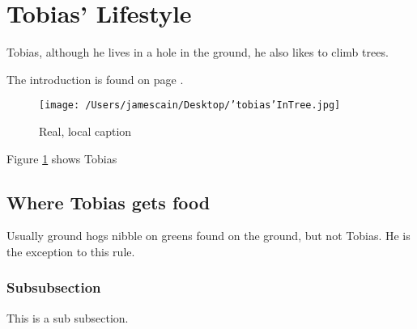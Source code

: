 \documentclass{article}
\begin{document}
\lipsum[1]


\newpage
\section{Tobias' Lifestyle}
Tobias, although he lives in a hole in the ground, he also likes to climb trees.

The introduction is found on page \pageref{sec:intro}.

\begin{figure}[H]
    \centering
    \texttt{[image: /Users/jamescain/Desktop/'tobias'InTree.jpg]}
    \caption[Optional caption]{Real, local caption}
    \label{fig:tobias}
\end{figure}

Figure \ref{fig:tobias} shows Tobias

\subsection{Where Tobias gets food}
Usually ground hogs nibble on greens found on the ground, but not Tobias. He is the exception to this rule.
\subsubsection{Subsubsection}
This is a sub subsection.
\end{document}
